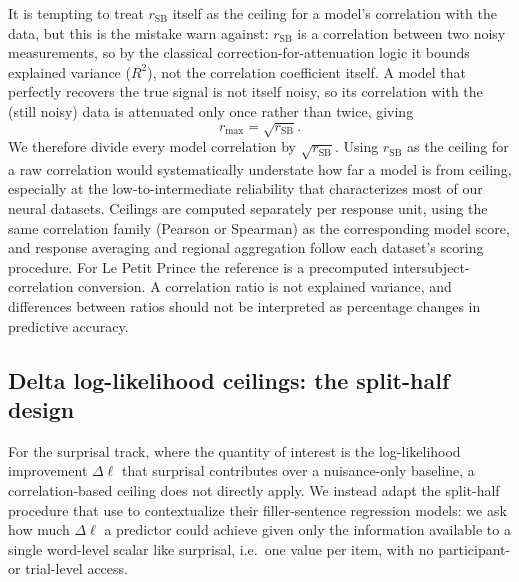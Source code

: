 It is tempting to treat $r_{\mathrm{SB}}$ itself as the ceiling for a model's correlation with the data, but this is the mistake \citeauthor{vanbree2025noiseceiling} warn against: $r_{\mathrm{SB}}$ is a correlation between two noisy measurements, so by the classical correction-for-attenuation logic it bounds explained variance ($R^2$), not the correlation coefficient itself. A model that perfectly recovers the true signal is not itself noisy, so its correlation with the (still noisy) data is attenuated only once rather than twice, giving
\[
r_{\max} = \sqrt{r_{\mathrm{SB}}}.
\]
We therefore divide every model correlation by $\sqrt{r_{\mathrm{SB}}}$. Using $r_{\mathrm{SB}}$ as the ceiling for a raw correlation would systematically understate how far a model is from ceiling, especially at the low-to-intermediate reliability that characterizes most of our neural datasets. Ceilings are computed separately per response unit, using the same correlation family (Pearson or Spearman) as the corresponding model score, and response averaging and regional aggregation follow each dataset's scoring procedure. For Le Petit Prince the reference is a precomputed intersubject-correlation conversion. A correlation ratio is not explained variance, and differences between ratios should not be interpreted as percentage changes in predictive accuracy.

\subsection{Delta log-likelihood ceilings: the split-half design}
\label{app:dll-ceiling}

For the surprisal track, where the quantity of interest is the log-likelihood improvement $\Delta\ell$ that surprisal contributes over a nuisance-only baseline, a correlation-based ceiling does not directly apply. We instead adapt the split-half procedure that \citet{timkey2026dissociation} use to contextualize their filler-sentence regression models: we ask how much $\Delta\ell$ a predictor could achieve given only the information available to a single word-level scalar like surprisal, i.e.\ one value per item, with no participant- or trial-level access.

